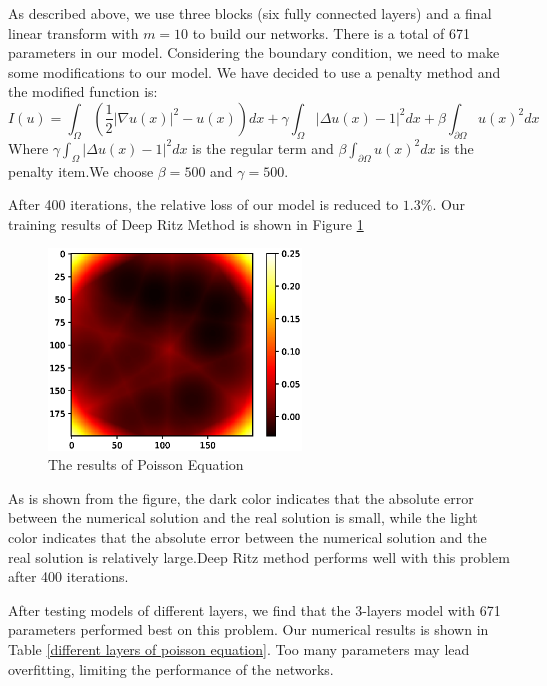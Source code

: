 \documentclass{article}
\begin{document}
\par As described above, we use three blocks (six fully connected layers) and a final linear transform with $m=10$ to build our networks. There is a total of 671 parameters in our model. Considering the boundary condition, we need to make some modifications to our model. We have decided to use a penalty method and the modified function is:
\begin{equation}
I(u)=\int_{\Omega}\left(\frac{1}{2}|\nabla u(x)|^2-u(x)\right)dx+\gamma\int_{\Omega}|\Delta u(x) - 1|^2dx+\beta\int_{\partial \Omega}u(x)^2dx
\end{equation}
Where $\gamma\int_{\Omega}|\Delta u(x) - 1|^2dx$ is the regular term and $\beta\int_{\partial \Omega}u(x)^2dx$ is the penalty item.We choose $\beta=500$ and $\gamma=500$.
\par After 400 iterations, the relative loss of our model is reduced to $1.3\%$. Our training results of Deep Ritz Method is shown in Figure \ref{3.1a}

\begin{figure}[ht]
 	 \centering
 	 \includegraphics[width=0.6\textwidth]{./images/loss_3-1.eps} 
	 \caption {The results of Poisson Equation}
	 \label{3.1a}
\end{figure}
As is shown from the figure, the dark color indicates that the absolute error between the numerical solution and the real solution is small, while the light color indicates that the absolute error between the numerical solution and the real solution is relatively large.Deep Ritz method performs well with this problem after 400 iterations.

\par After testing models of different layers, we find that the 3-layers model with 671 parameters performed best on this problem. Our numerical results is shown in Table \ref{different layers of poisson equation}. Too many parameters may lead overfitting, limiting the performance of the networks.
\end{document}
